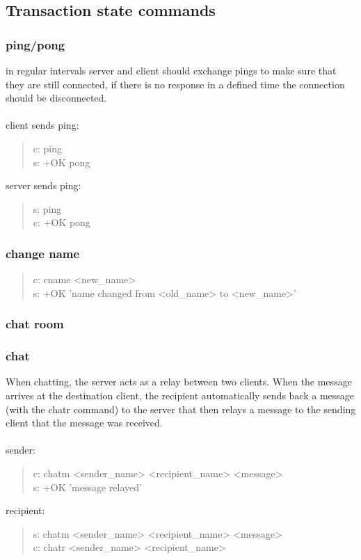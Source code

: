 \documentclass[a4paper,11pt]{article}
\begin{document}
\subsection{Transaction state commands}
\subsubsection{ping/pong}
in regular intervals server and client should exchange pings to make sure that they are still connected, if there is no response in a defined time the connection should be disconnected.\\\\
client sends ping:
\begin{quote}
  c: ping\\
  s: +OK pong
\end{quote}
\noindent
server sends ping:
\begin{quote}
  s: ping\\
  c: +OK pong
\end{quote}


\subsubsection{change name}

\begin{quote}
  c: cname <new\_name>\\
  s: +OK 'name changed from <old\_name> to <new\_name>'
\end{quote}

\subsubsection{chat room}

\subsubsection{chat}
When chatting, the server acts as a relay between two clients. When the message arrives at the destination client, the recipient automatically sends back a message (with the chatr command) to the server that then relays a message to the sending client that the message was received.\\\\
sender:
\begin{quote}
  c: chatm <sender\_name> <recipient\_name> <message>\\ %
  s: +OK 'message relayed'
\end{quote}
\noindent
recipient:
\begin{quote}
    s: chatm <sender\_name> <recipient\_name> <message>\\
  c: chatr <sender\_name> <recipient\_name>%
\end{quote}
\clearpage
\end{document}
